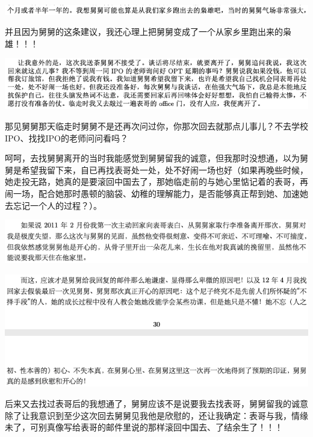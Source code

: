 \documentclass[9pt, b5paper]{article}
\begin{document}
\begin{center}
\includegraphics[width=.9\linewidth]{./pic/backups_plans_20210416_074428.png}
\end{center}

并且因为舅舅的这条建议，我还心理上把舅舅变成了一个从家乡里跑出来的枭雄！！！

\begin{center}
\includegraphics[width=.9\linewidth]{./pic/backups_plans_20210416_074805.png}
\end{center}

那见舅舅那天临走时舅舅不是还再次问过你，你那次回去就那点儿事儿？不去学校IPO、找找IPO的老师问问看吗？

呵呵，去找舅舅离开的当时我能感觉到舅舅留我的诚意，但我那时没想通，以为舅舅是希望我留下来，自已再找表哥处一处，处不好闹一场也好（如果再晚些时候，她走投无路，她真的是要滚回中国去了，那她临走前的与她心里惦记着的表哥，再闹一场，配合她那时愚顿的脑袋、幼稚的理解能力，是否能够真正帮到她、加速她去忘记一个人的过程？）。

\begin{center}
\includegraphics[width=.9\linewidth]{./pic/backups_plans_20210416_080633.png}
\end{center}

\begin{center}
\includegraphics[width=.9\linewidth]{./pic/backups_plans_20210416_080830.png}
\end{center}

后来又去找过表哥后的我想通了，舅舅应该不是说要我去找表哥，舅舅留我的诚意除了让我意识到至少这次回去舅舅见我他是欣慰的，还让我确定：表哥与我，情缘未了，可别真像写给表哥的邮件里说的那样滚回中国去、了结余生了！！！
\end{document}
